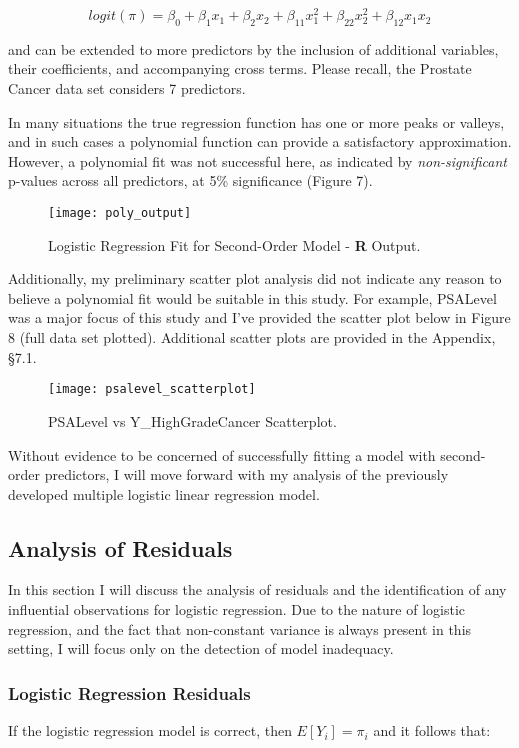\begin{equation}
logit(\pi) = \beta_0 + \beta_1x_1 + \beta_2x_2 + \beta_{11}x_1^2 + \beta_{22}x_2^2 + \beta_{12}x_1x_2
\end{equation}

\noindent and can be extended to more predictors by the inclusion of additional variables, their coefficients, and accompanying cross terms. Please recall, the Prostate Cancer data set considers 7 predictors. \par
In many situations the true regression function has one or more peaks or valleys, and in such cases a polynomial function can provide a satisfactory approximation. However, a polynomial fit was not successful here, as indicated by \textit{non-significant} p-values across all predictors, at 5\% significance (Figure 7). 

\begin{figure}[H]
	\centering
	\texttt{[image: poly\_output]}
	\caption{Logistic Regression Fit for Second-Order Model - \textbf{R} Output.}
\end{figure}

Additionally, my preliminary scatter plot analysis did not indicate any reason to believe a polynomial fit would be suitable in this study. For example, PSALevel was a major focus of this study and I've provided the scatter plot below in Figure 8 (full data set plotted). Additional scatter plots are provided in the Appendix, \S7.1.

\begin{figure}[H]
	\centering
	\texttt{[image: psalevel\_scatterplot]}
	\caption{PSALevel vs Y\_HighGradeCancer Scatterplot.}
\end{figure}

Without evidence to be concerned of successfully fitting a model with second-order predictors, I will move forward with my analysis of the previously developed multiple logistic linear regression model.


\subsection{Analysis of Residuals}
In this section I will discuss the analysis of residuals and the identification of any influential observations for logistic regression. Due to the nature of logistic regression, and the fact that non-constant variance is always present in this setting, I will focus only on the detection of model inadequacy.

\subsubsection{Logistic Regression Residuals}
If the logistic regression model is correct, then \(E[Y_i]=\pi_i\) and it follows that:

